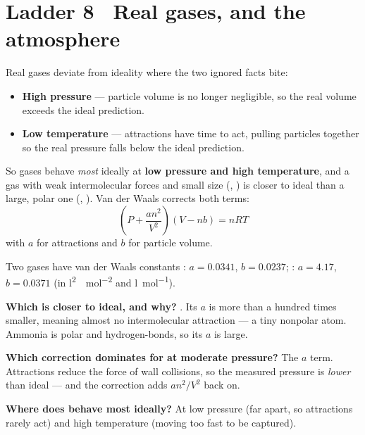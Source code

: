 \documentclass{apchem-worksheet}
\begin{document}
\section*{\sffamily Ladder 8 \textbullet\ Real gases, and the atmosphere}

Real gases deviate from ideality where the two ignored facts bite:
\begin{itemize}[leftmargin=*,itemsep=0.15em]
  \item \textbf{High pressure} --- particle volume is no longer
        negligible, so the real volume exceeds the ideal prediction.
  \item \textbf{Low temperature} --- attractions have time to act,
        pulling particles together so the real pressure falls below the
        ideal prediction.
\end{itemize}
So gases behave \emph{most} ideally at \textbf{low pressure and high
temperature}, and a gas with weak intermolecular forces and small size
(, ) is closer to ideal than a large, polar one
(, ). Van der Waals corrects both terms:
\[ \left(P + \frac{an^2}{V^2}\right)(V - nb) = nRT \]
with $a$ for attractions and $b$ for particle volume.

\begin{workedexample}
Two gases have van der Waals constants
: $a = 0.0341$, $b = 0.0237$; \quad
{}: $a = 4.17$, $b = 0.0371$
(in \si{\litre\squared\atm\per\mole\squared} and
\si{\litre\per\mole}).

\textbf{Which is closer to ideal, and why?} . Its $a$ is more than
a hundred times smaller, meaning almost no intermolecular attraction --- a
tiny nonpolar atom. Ammonia is polar and hydrogen-bonds, so its $a$ is
large.

\textbf{Which correction dominates for  at moderate pressure?}
The $a$ term. Attractions reduce the force of wall collisions, so the
measured pressure is \emph{lower} than ideal --- and the correction adds
$an^2/V^2$ back on.

\textbf{Where does  behave most ideally?} At low pressure (far
apart, so attractions rarely act) and high temperature (moving too fast
to be captured).
\end{workedexample}
\end{document}
